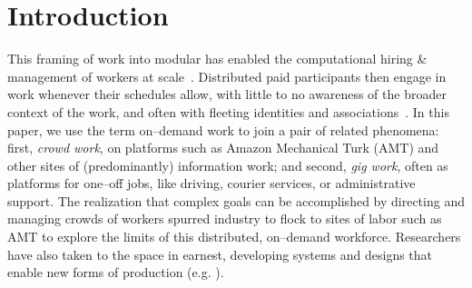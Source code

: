 \documentclass[trackingWork]{subfiles}
\begin{document}
\section{Introduction}\label{sec:introduction}


This framing of work into modular
has enabled the computational hiring \& management of workers at scale~\cite{howe2008crowdsourcing,Bigham2014,crowdworkFuture}.
Distributed paid participants then engage in work whenever their schedules allow,
with little to no awareness of the broader context of the work, and
often with fleeting identities and associations~\cite{martin2014being,uberAlgorithm}.
In this paper, we use the term on--demand work to join a pair of related phenomena:
first, \textit{crowd work}, on platforms such as Amazon Mechanical Turk (AMT) and other sites of (predominantly) information work;
and second, \textit{gig work}, often as platforms for one--off jobs, like driving, courier services, or administrative support.
The realization that complex goals can be accomplished by directing and managing crowds of workers spurred industry to flock to sites of labor
such as AMT to explore the limits of this distributed, on--demand workforce.
Researchers have also taken to the space in earnest,
developing systems and designs that enable new forms of production
(e.g. \cite{bernsteinSoylent,vizwiz,paolacci2010running}).
\end{document}
